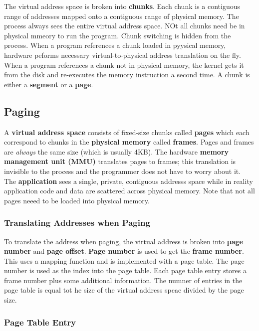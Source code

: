 \documentclass{article}
\newcommand{\bold}[1]{\textbf{#1}}
\begin{document}
The virtual address space is broken into \bold{chunks}. Each chunk is a contiguous range of addresses mapped onto a contiguous range of physical memory. The process always sees the entire virtual address space. NOt all chunks need be in physical mmeory to run the program. Chunk switching is hidden from the process. When a program references a chunk loaded in pyysical memory, hardware peforms necessary virtual-to-physical address translation on the fly. When a program references a chunk not in physical memory, the kernel gets it from the disk and re-executes the memory instruction a second time. A chunk is either a \bold{segment} or a \bold{page}. \\ 

\subsection{Paging}

A \bold{virtual address space} consists of fixed-size chunks called \bold{pages} which each correspond to chunks in the \bold{physical memory} called \bold{frames}. Pages and frames are \emph{always} the same size (which is usually 4KB). The hardware \bold{memory management unit (MMU)} translates pages to frames; this translation is invisible to the process and the programmer does not have to worry about it. \\ 

The \bold{application} sees a single, private, contiguous addresss space while in reality application code and data are scattered across physical memory. Note that not all pages neeed to be loaded into physical memory. 

\subsubsection{Translating Addresses when Paging}

To translate the address when paging, the virtual address is broken into \bold{page number} and \bold{page offset}. \bold{Page number} is used to get the \bold{frame number}. This uses a mapping function and is implemented with a page table. The page number is used as the index into the page table. Each page table entry stores a frame number plus some additional information. The numner of entries in the page table is equal tot he size of the virtual address spcae divided by the page size. 

\subsubsection{Page Table Entry}
\end{document}

